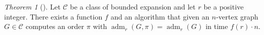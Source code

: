 \documentclass[1p,number,a4paper]{elsarticle}
\theoremstyle{remark}
\newcommand{\Cc}{\mathscr{C}}
\DeclareMathOperator{\adm}{adm}
\newtheorem{theorem}{Theorem}[section]
\begin{document}
\begin{theorem}[\cite{dvovrak2013constant}]\label{thm:dvorak-adm}
 Let $\Cc$ be a class of bounded expansion and let $r$ be a positive
 integer. There exists a function $f$ and an algorithm that given 
 an $n$-vertex graph $G\in \Cc$ computes an order $\pi$ with 
 $\adm_r(G,\pi)=\adm_r(G)$ in time $f(r)\cdot n$. 
\end{theorem}

%
%
%
%
%
% 
%
\end{document}
